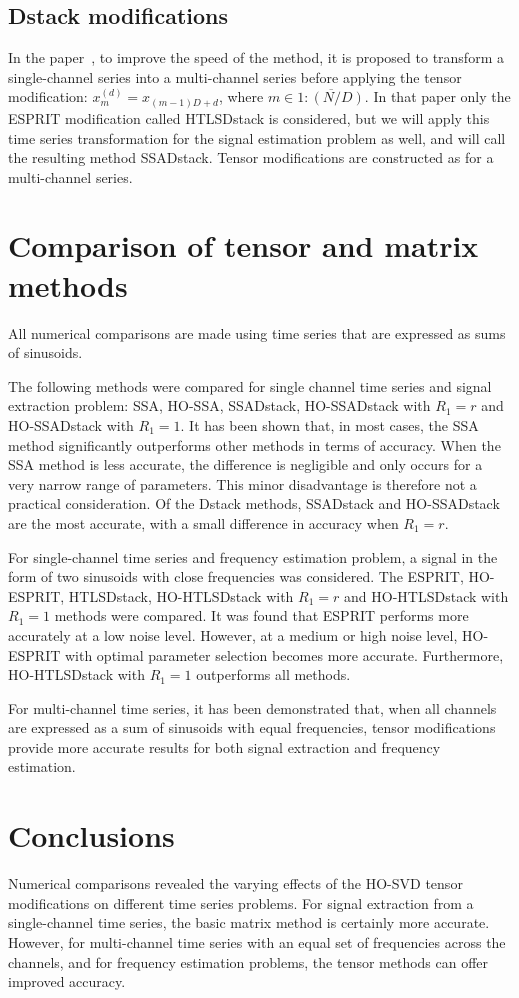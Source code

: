 \documentclass[12pt]{article}
\theoremstyle{definition}
\begin{document}
\subsection{Dstack modifications}
In the paper~\cite{Papy2009}, to improve the speed of the method, it
is proposed to transform a single-channel series into a multi-channel
series before applying the tensor modification: $x_m^{(d)} =
x_{(m-1)D + d}$, where $m \in \overline{1:(N/D)}$. In that paper only
the ESPRIT modification called HTLSDstack is considered, but we will
apply this time series transformation for the signal estimation
problem as well, and will call the resulting method SSADstack.
Tensor modifications are constructed as for a multi-channel series.

\section{Comparison of tensor and matrix methods}
All numerical comparisons are made using time series that are
expressed as sums of sinusoids.

The following methods were compared for single channel time series
and signal extraction problem: SSA, HO-SSA, SSADstack, HO-SSADstack
with $R_1=r$ and HO-SSADstack with $R_1=1$. It has been shown that,
in most cases, the SSA method significantly outperforms other methods
in terms of accuracy. When the SSA method is less accurate, the
difference is negligible and only occurs for a very narrow range of
parameters. This minor disadvantage is therefore not a practical
consideration. Of the Dstack methods, SSADstack and HO-SSADstack are
the most accurate, with a small difference in accuracy when $R_1=r$.

For single-channel time series and frequency estimation problem, a
signal in the form of two sinusoids with close frequencies was
considered. The ESPRIT, HO-ESPRIT, HTLSDstack, HO-HTLSDstack with
$R_1=r$ and HO-HTLSDstack with $R_1=1$ methods were compared. It was
found that ESPRIT performs more accurately at a low noise level.
However, at a medium or high noise level, HO-ESPRIT with optimal
parameter selection becomes more accurate. Furthermore, HO-HTLSDstack
with $R_1=1$ outperforms all methods.

For multi-channel time series, it has been demonstrated that, when
all channels are expressed as a sum of sinusoids with equal
frequencies, tensor modifications provide more accurate results for
both signal extraction and frequency estimation.

\section{Conclusions}
Numerical comparisons revealed the varying effects of the HO-SVD
tensor modifications on different time series problems. For signal
extraction from a single-channel time series, the basic matrix method
is certainly more accurate. However, for multi-channel time series
with an equal set of frequencies across the channels, and for
frequency estimation problems, the tensor methods can offer improved accuracy.
\end{document}
